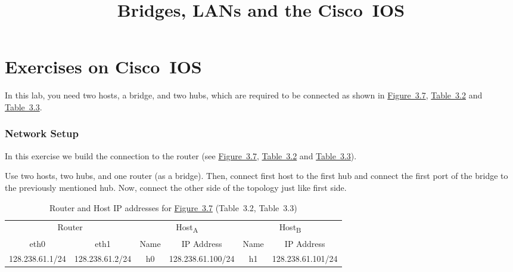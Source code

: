 \documentclass{../UTNetLab}
\title{Bridges, LANs and the Cisco~IOS}
\begin{document}
\part{Exercises on Cisco~IOS}
    In this lab, you need two hosts, a bridge, and two hubs, which are required to be connected as shown in \hyperref[fig:3.7]{Figure~3.7}, \hyperref[tab:3.2]{Table~3.2} and \hyperref[tab:3.3]{Table~3.3}.

\section{Network Setup}
    In this exercise we build the connection to the router (see \hyperref[fig:3.7]{Figure~3.7}, \hyperref[tab:3.2]{Table~3.2} and \hyperref[tab:3.3]{Table~3.3}).

    Use two hosts, two hubs, and one router (as a bridge). Then, connect first host to the first hub and connect the first port of the bridge to the previously mentioned hub. Now, connect the other side of the topology just like first side.

    \begin{table}[H]
        \caption{Router and Host IP addresses for \hyperref[fig:3.7]{Figure~3.7} (Table~3.2\label{tab:3.2}, Table~3.3\label{tab:3.3})}
        \centering
        \begin{tabular}{ *2c|*2c|*2c }
            \hline \hline
            \multicolumn{2}{c|}{Router} & \multicolumn{2}{c|}{Host\textsubscript{A}} & \multicolumn{2}{c}{Host\textsubscript{B}} \\
            eth0 & eth1 & Name & IP Address & Name & IP Address \\
            \hline 
            128.238.61.1/24 & 128.238.61.2/24 & h0 & 128.238.61.100/24 & h1 & 128.238.61.101/24 \\
            \hline \hline
            \end{tabular}
    \end{table}
\end{document}
